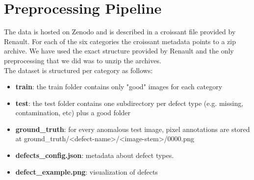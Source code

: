 \documentclass{article}
\begin{document}
\section{Preprocessing Pipeline}
The data is hosted on Zenodo and is described in a croissant file provided by Renault. For each of the six categories the croissant metadata points to a zip archive. We have used the exact structure provided by Renault and the only preprocessing that we did was to unzip the archives.
\\
The dataset is structured per category as follows:
\begin{itemize}
	\item \textbf{train}: the train folder contains only "good" images for each category
	\item \textbf{test}: the test folder contains one subdirectory per defect type (e.g. missing, contamination, etc) plus a good folder
	\item \textbf{ground\_truth}: for every anomalous test image, pixel annotations are stored at ground\_truth/<defect-name>/<image-stem>/0000.png
	\item \textbf{defects\_config.json}: metadata about defect types.
	\item \textbf{defect\_example.png}: visualization of defects
\end{itemize}




\end{document}
